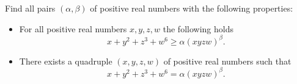 Find all pairs $(\alpha,\beta)$ of positive real numbers with the following properties:
\begin{itemize}
    \item For all positive real numbers $x,y,z,w$ the following holds
    $$x+y^2+z^3+w^6 \geq \alpha (xyzw)^\beta.$$
    \item There exists a quadruple $(x,y,z,w)$ of positive real numbers such that
    $$x+y^2+z^3+w^6 = \alpha (xyzw)^\beta.$$
\end{itemize}
